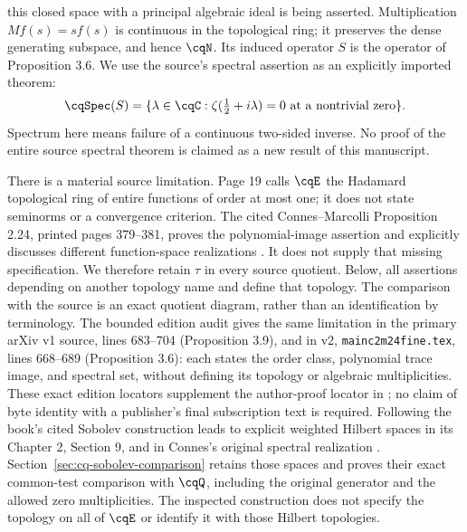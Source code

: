this closed space with a principal algebraic ideal is being asserted.
Multiplication $M f(s)=sf(s)$ is continuous in the topological ring;
it preserves the dense generating subspace, and hence $\cqN$.
Its induced operator $S$ is the operator of Proposition 3.6.
We use the source's spectral assertion as an explicitly imported theorem:
\begin{equation}\label{eq:cq-source-spectrum}
 \cqSpec(S)=\{\lambda\in\cqC:
             \zeta(\tfrac12+i\lambda)=0
             \text{ at a nontrivial zero}\}.
\end{equation}
Spectrum here means failure of a continuous two-sided inverse.
No proof of the entire source spectral theorem is claimed as a new
result of this manuscript.

There is a material source limitation. Page 19 calls $\cqE$ the
Hadamard topological ring of entire functions of order at most one;
it does not state seminorms or a convergence criterion. The cited
Connes--Marcolli Proposition 2.24, printed pages 379--381,
proves the polynomial-image assertion and explicitly discusses
different function-space realizations \cite{cqCM}. It does not supply
that missing specification. We therefore retain $\tau$ in every
source quotient. Below, all assertions depending on another topology
name and define that topology. The comparison with the source is an
exact quotient diagram, rather than an identification by terminology.
The bounded edition audit gives the same limitation in the primary
arXiv v1 source, lines 683--704 (Proposition 3.9), and in v2,
\texttt{mainc2m24fine.tex}, lines 668--689 (Proposition 3.6):
each states the order class, polynomial trace image, and spectral
set, without defining its topology or algebraic multiplicities.
These exact edition locators supplement the author-proof locator
in \cite{cqCCM}; no claim of byte identity with a publisher's final
subscription text is required.
Following the book's cited Sobolev construction leads to explicit
weighted Hilbert spaces in its Chapter 2, Section 9, and in
Connes's original spectral realization \cite{cqConnesSelecta}.
Section~\ref{sec:cq-sobolev-comparison} retains those spaces and
proves their exact common-test comparison with $\cqQ$, including
the original generator and the allowed zero multiplicities.
The inspected construction does not specify the topology on all
of $\cqE$ or identify it with those Hilbert topologies.

